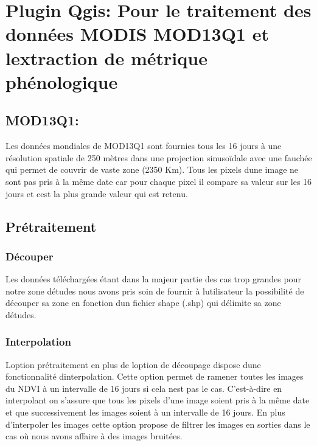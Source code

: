 

\section*{Plugin Qgis\+: Pour le traitement des données M\+O\+D\+IS M\+O\+D13\+Q1 et l\textquotesingle{}extraction de métrique phénologique}

\subsection*{M\+O\+D13\+Q1\+:}

Les données mondiales de M\+O\+D13\+Q1 sont fournies tous les 16 jours à une résolution spatiale de 250 mètres dans une projection sinusoïdale avec une fauchée qui permet de couvrir de vaste zone (2350 Km). Tous les pixels d\textquotesingle{}une image ne sont pas pris à la même date car pour chaque pixel il compare sa valeur sur les 16 jours et c\textquotesingle{}est la plus grande valeur qui est retenu.

\subsection*{Prétraitement}

\subsubsection*{Découper}

Les données téléchargées étant dans la majeur partie des cas trop grandes pour notre zone d\textquotesingle{}études nous avons pris soin de fournir à l\textquotesingle{}utilisateur la possibilité de découper sa zone en fonction d\textquotesingle{}un fichier shape (.shp) qui délimite sa zone d\textquotesingle{}études. \subsubsection*{Interpolation}

L\textquotesingle{}option prétraitement en plus de l\textquotesingle{}option de découpage dispose d\textquotesingle{}une fonctionnalité d\textquotesingle{}interpolation. Cette option permet de ramener toutes les images du N\+D\+VI à un intervalle de 16 jours si cela n\textquotesingle{}est pas le cas. C’est-\/à-\/dire en interpolant on s’assure que tous les pixels d’une image soient pris à la même date et que successivement les images soient à un intervalle de 16 jours. En plus d’interpoler les images cette option propose de filtrer les images en sorties dans le cas où nous avons affaire à des images bruitées.


